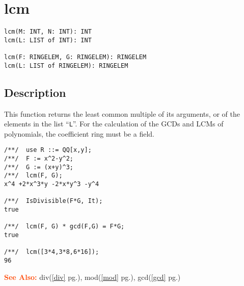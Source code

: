 \documentclass[a4paper]{mybook}
\newenvironment{command}{}{} %
\newcommand\SeeAlso{\par\textcolor{OrangeRed}{\textbf{\large See Also: }}}
\begin{document}
\section{lcm}
\label{lcm}
\begin{command} %


\begin{Verbatim}[label=syntax, rulecolor=\color{MidnightBlue},
frame=single]
lcm(M: INT, N: INT): INT
lcm(L: LIST of INT): INT

lcm(F: RINGELEM, G: RINGELEM): RINGELEM
lcm(L: LIST of RINGELEM): RINGELEM
\end{Verbatim}


\subsection*{Description}

This function returns the least common multiple of its arguments,
or of the elements in the list ``\verb&L&''.
For the calculation of the GCDs and LCMs of polynomials, the
coefficient ring must be a field.
\begin{Verbatim}[label=example, rulecolor=\color{PineGreen}, frame=single]
/**/  use R ::= QQ[x,y];
/**/  F := x^2-y^2;
/**/  G := (x+y)^3;
/**/  lcm(F, G);
x^4 +2*x^3*y -2*x*y^3 -y^4

/**/  IsDivisible(F*G, It);
true

/**/  lcm(F, G) * gcd(F,G) = F*G;
true

/**/  lcm([3*4,3*8,6*16]);
96
\end{Verbatim}


\SeeAlso %
  div(\ref{div} pg.\pageref{div}), 
    mod(\ref{mod} pg.\pageref{mod}), 
    gcd(\ref{gcd} pg.\pageref{gcd})
\end{command} %
\end{document}
